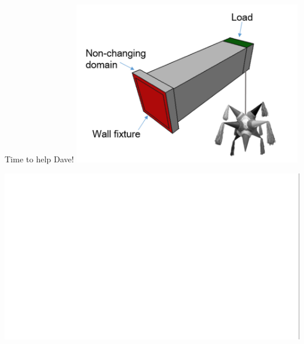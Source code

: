 \begin{frame}{Time to help Dave!}
	\includegraphics[width=0.75\textwidth, center]{Pictures/FirstHalf/pinata_new}
\end{frame}


\pagestyle{empty}
\begin{frame}
	\includegraphics[width=18.3\textwidth, center]{Pictures/FirstHalf/white_background}
\end{frame}

